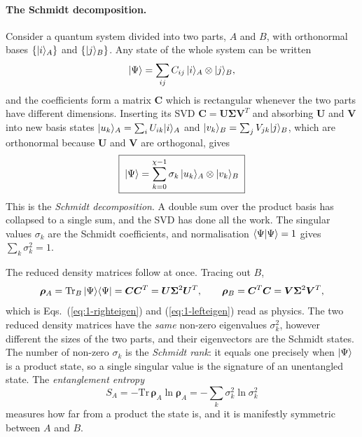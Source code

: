 \paragraph{The Schmidt decomposition.}
Consider a quantum system divided into two parts, $A$ and $B$, with
orthonormal bases $\{\vert i \rangle_A\}$ and $\{\vert j \rangle_B\}$.  Any state of the
whole system can be written
\begin{equation}
  \vert \Psi \rangle = \sum_{ij} C_{ij}\,\vert i \rangle_A\otimes\vert j \rangle_B ,
  \label{eq:1-bipartite}
\end{equation}
and the coefficients form a matrix $\bm{C}$ which is rectangular whenever the
two parts have different dimensions.  Inserting its SVD
$\bm{C}=\bm{U}\bm{\Sigma}\bm{V}^{T}$ and absorbing $\bm{U}$ and $\bm{V}$ into
new basis states $\vert u_k \rangle_A=\sum_i U_{ik}\vert i \rangle_A$ and
$\vert v_k \rangle_B=\sum_j V_{jk}\vert j \rangle_B$, which are orthonormal because $\bm{U}$
and $\bm{V}$ are orthogonal, gives
\begin{equation}
  \boxed{\;
  \vert \Psi \rangle = \sum_{k=0}^{\chi-1}\sigma_k\,\vert u_k \rangle_A\otimes\vert v_k \rangle_B \; }
  \label{eq:1-schmidt}
\end{equation}
This is the \emph{Schmidt decomposition}.  A double sum over the product basis
has collapsed to a single sum, and the SVD has done all the work.  The
singular values $\sigma_k$ are the Schmidt coefficients, and normalisation
$\langle \Psi \vert \Psi \rangle=1$ gives $\sum_k\sigma_k^2=1$.

The reduced density matrices follow at once.  Tracing out $B$,
\begin{equation}
  \bm{\rho}_A = \mathrm{Tr}_B\,| \Psi \rangle \langle \Psi | = \bm{C}\bm{C}^{T}
   = \bm{U}\bm{\Sigma}^2\bm{U}^{T},
  \qquad
  \bm{\rho}_B = \bm{C}^{T}\bm{C} = \bm{V}\bm{\Sigma}^2\bm{V}^{T},
  \label{eq:1-reduceddm}
\end{equation}
which is Eqs.~(\ref{eq:1-righteigen}) and (\ref{eq:1-lefteigen}) read as
physics.  The two reduced density matrices have the \emph{same} non-zero
eigenvalues $\sigma_k^2$, however different the sizes of the two parts, and
their eigenvectors are the Schmidt states.  The number of non-zero $\sigma_k$
is the \emph{Schmidt rank}: it equals one precisely when $\vert \Psi \rangle$ is a
product state, so a single singular value is the signature of an unentangled
state.  The \emph{entanglement entropy}
\begin{equation}
  S_A = -\mathrm{Tr}\,\bm{\rho}_A\ln\bm{\rho}_A
      = -\sum_k \sigma_k^2\ln\sigma_k^2
  \label{eq:1-entropy}
\end{equation}
measures how far from a product the state is, and it is manifestly symmetric
between $A$ and $B$.

